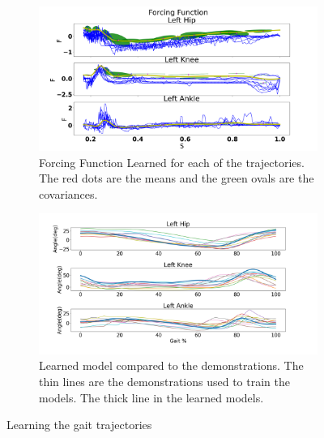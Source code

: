 \begin{figure}[!h]
    \begin{subfigure}{\textwidth}
        \centering
        \includegraphics[scale=0.35]{images/gait_data/force_function2.png}
        \caption[Gait Forcing Function]{Forcing Function Learned for each of the trajectories. The red dots are the means and the green ovals are the covariances.}
        \label{fig:force}  
    \end{subfigure}

    \begin{subfigure}{\textwidth}
       \centering
    \includegraphics[scale=0.35]{images/gait_data/learnedModel.png}
    \caption[Learned Gait Model]{Learned model compared to the demonstrations. The thin lines are the demonstrations used to train the models. The thick line in the learned models.}
    \label{fig:learnedModel}
    \end{subfigure}
    \caption{Learning the gait trajectories}
    \label{fig:learninggaittrajectories}
\end{figure}






